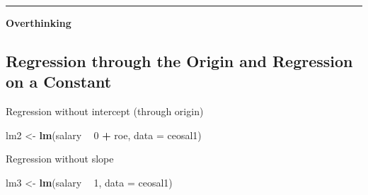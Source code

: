 \documentclass[]{book}
\newenvironment{Shaded}{\begin{snugshade}}{\end{snugshade}}
\newcommand{\DataTypeTok}[1]{\textcolor[rgb]{0.13,0.29,0.53}{#1}}
\newcommand{\DecValTok}[1]{\textcolor[rgb]{0.00,0.00,0.81}{#1}}
\newcommand{\KeywordTok}[1]{\textcolor[rgb]{0.13,0.29,0.53}{\textbf{#1}}}
\newcommand{\NormalTok}[1]{#1}
\newcommand{\OperatorTok}[1]{\textcolor[rgb]{0.81,0.36,0.00}{\textbf{#1}}}
\newcommand{\StringTok}[1]{\textcolor[rgb]{0.31,0.60,0.02}{#1}}
\begin{document}
\begin{center}\rule{0.5\linewidth}{\linethickness}\end{center}

\textbf{Overthinking}

\hypertarget{regression-through-the-origin-and-regression-on-a-constant}{%
\subsection{Regression through the Origin and Regression on a Constant}\label{regression-through-the-origin-and-regression-on-a-constant}}

Regression without intercept (through origin)

\begin{Shaded}
\begin{Highlighting}[]
\NormalTok{lm2 <-}\StringTok{ }\KeywordTok{lm}\NormalTok{(salary }\OperatorTok{~}\StringTok{  }\DecValTok{0} \OperatorTok{+}\StringTok{ }\NormalTok{roe, }\DataTypeTok{data =}\NormalTok{ ceosal1)}
\end{Highlighting}
\end{Shaded}

Regression without slope

\begin{Shaded}
\begin{Highlighting}[]
\NormalTok{lm3 <-}\StringTok{ }\KeywordTok{lm}\NormalTok{(salary }\OperatorTok{~}\StringTok{ }\DecValTok{1}\NormalTok{, }\DataTypeTok{data =}\NormalTok{ ceosal1)}
\end{Highlighting}
\end{Shaded}
\end{document}
